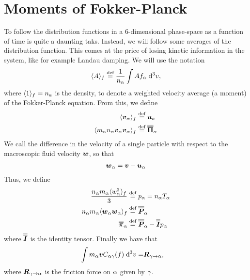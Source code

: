 \section{Moments of Fokker-Planck}
To follow the distribution functions in a 6-dimensional phase-space as a function of time is quite a daunting taks.
Instead, we will follow some averages of the distribution function.
This comes at the price of losing kinetic information in the system, like for example Landau damping.
We will use the notation
%
\begin{align*}
    \langle{A}\rangle_{f} \overset{\text{def}}{=} \frac{1}{n_\alpha}\int {Af_\alpha} \; \text{d} {^3v},
\end{align*}
%
where $\langle{1}\rangle_f=n_a$ is the density, to denote a weighted velocity average (a moment) of the Fokker-Planck equation.
From this, we define
%
\begin{align*}
    \langle{\boldsymbol{v}_\alpha}\rangle_f        \overset{\text{def}}{=}& \; \boldsymbol{u}_a      \\
    \langle{m_\alpha n_\alpha\boldsymbol{v}_\alpha\boldsymbol{v}_\alpha}\rangle_f \overset{\text{def}}{=}&\; \boldsymbol{\overline{\overline{\Pi}}}_\alpha
\end{align*}
%
We call the difference in the velocity of a single particle with respect to the macroscopic fluid velocity $\boldsymbol{w}$, so that
%
\begin{align*}
    \boldsymbol{w}_\alpha = \boldsymbol{v} - \boldsymbol{u}_\alpha
\end{align*}
%
Thus, we define
%
\begin{align*}
    \frac{n_\alpha m_\alpha\langle{w_\alpha^2}\rangle_f}{3} \overset{\text{def}}{=}& \; p_\alpha = n_\alpha T_\alpha\\
    n_\alpha m_\alpha\langle{\boldsymbol{w}_{\alpha}\boldsymbol{w}_{\alpha}}\rangle_f \overset{\text{def}}{=}& \; \boldsymbol{\overline{\overline{P}}}_\alpha\\
    \boldsymbol{\overline{\overline{\pi}}}_\alpha \overset{\text{def}}{=}& \; \boldsymbol{\overline{\overline{P}}}_\alpha - \boldsymbol{\overline{\overline{I}}}p_\alpha\\
\end{align*}
%
where $\boldsymbol{\overline{\overline{I}}}$ is the identity tensor.
Finally we have that
%
\begin{align*}
    \int {m_\alpha\boldsymbol{v} C_{\alpha\gamma}(f)} \; \text{d} {^3v} =& \boldsymbol{R}_{\gamma\to\alpha},
\end{align*}
%
where $\boldsymbol{R}_{\gamma\to\alpha}$ is the friction force on $\alpha$ given by $\gamma$.

